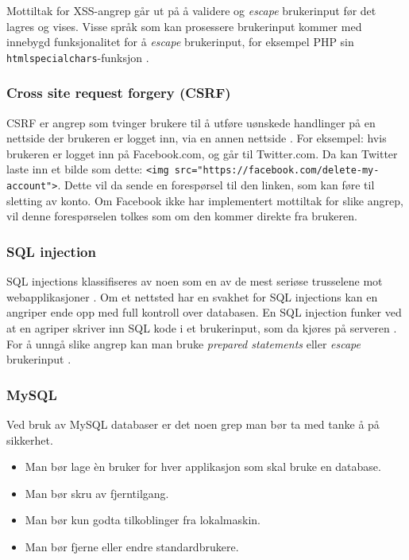Mottiltak for XSS-angrep går ut på å validere og \textit{escape} brukerinput før det lagres og vises.
Visse språk som kan prosessere brukerinput kommer med innebygd funksjonalitet for å \textit{escape} brukerinput, for eksempel PHP sin \lstinline{htmlspecialchars}-funksjon \cite{php_htmlspecialchars}.

\subsubsection{Cross site request forgery (CSRF)}
\label{sec:analysis-security-csrf}
CSRF er angrep som tvinger brukere til å utføre uønskede handlinger på en nettside der brukeren er logget inn, via en annen nettside \cite[s.~183-186]{NattTomHeine2015Datasikkerhet}. For eksempel: hvis brukeren er logget inn på Facebook.com, og går til Twitter.com. Da kan Twitter laste inn et bilde som dette: \lstinline{<img src="https://facebook.com/delete-my-account">}. Dette vil da sende en forespørsel til den linken, som kan føre til sletting av konto. Om Facebook ikke har implementert mottiltak for slike angrep, vil denne forespørselen tolkes som om den kommer direkte fra brukeren.

\subsubsection{SQL injection}
\label{sec:analysis-security-sql-injection}
SQL injections klassifiseres av noen som en av de mest seriøse trusselene mot webapplikasjoner \cite[s.~1]{halfond2006classification}. Om et nettsted har en svakhet for SQL injections kan en angriper ende opp med full kontroll over databasen.
En SQL injection funker ved at en agriper skriver inn SQL kode i et brukerinput, som da kjøres på serveren \cite[s.~2]{halfond2006classification}.
For å unngå slike angrep kan man bruke \textit{prepared statements} eller \textit{escape} brukerinput \cite[s.~6]{halfond2006classification}.

\subsubsection{MySQL}
\label{sec:analysis-security-mysql}
Ved bruk av MySQL databaser er det noen grep man bør ta med tanke 
å på sikkerhet.
\begin{itemize}
\item Man bør lage èn bruker for hver applikasjon som skal bruke en database. \cite{ellingwood_2013}
\item Man bør skru av fjerntilgang.
\item Man bør kun godta tilkoblinger fra lokalmaskin.
\item Man bør fjerne eller endre standardbrukere.
\end{itemize}

